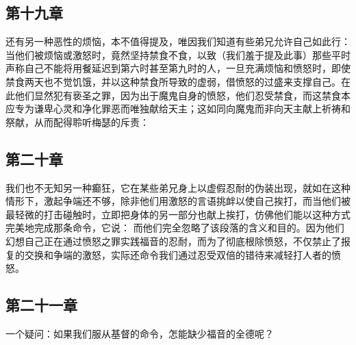 
\subsection{第十九章}

\par

还有另一种恶性的烦恼，本不值得提及，唯因我们知道有些弟兄允许自己如此行：当他们被烦恼或激怒时，竟然坚持禁食不食，以致（我们羞于提及此事）那些平时声称自己不能将用餐延迟到第六时甚至第九时的人，一旦充满烦恼和愤怒时，即使禁食两天也不觉饥饿，并以这种禁食所导致的虚弱，借愤怒的过盛来支撑自己。在此他们显然犯有亵圣之罪，因为出于魔鬼自身的愤怒，他们忍受禁食，而这禁食本应专为谦卑心灵和净化罪恶而唯独献给天主；这如同向魔鬼而非向天主献上祈祷和祭献，从而配得聆听梅瑟的斥责：\par


\subsection{第二十章}

\par

我们也不无知另一种癫狂，它在某些弟兄身上以虚假忍耐的伪装出现，就如在这种情形下，激起争端还不够，除非他们用激怒的言语挑衅以使自己挨打，而当他们被最轻微的打击碰触时，立即把身体的另一部分也献上挨打，仿佛他们能以这种方式完美地完成那条命令，它说： 而他们完全忽略了该段落的含义和目的。因为他们幻想自己正在通过愤怒之罪实践福音的忍耐，而为了彻底根除愤怒，不仅禁止了报复的交换和争端的激怒，实际还命令我们通过忍受双倍的错待来减轻打人者的愤怒。\par


\subsection{第二十一章}

一个疑问：如果我们服从基督的命令，怎能缺少福音的全德呢？\par

